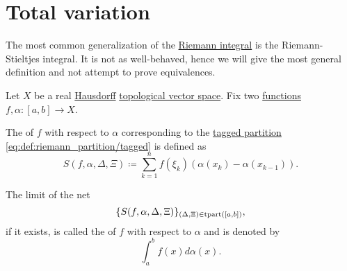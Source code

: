 \section{Total variation}\label{sec:total_variation}

\begin{definition}\label{def:riemann_stieltjes_integral}
  The most common generalization of the \hyperref[def:riemann_integral]{Riemann integral} is the Riemann-Stieltjes integral. It is not as well-behaved, hence we will give the most general definition and not attempt to prove equivalences.

  Let \( X \) be a real \hyperref[def:separation_axioms/T2]{Hausdorff} \hyperref[def:topological_vector_space]{topological vector space}. Fix two \hyperref[def:function]{functions} \( f, \alpha: [a, b] \to X \).

  The  of \( f \) with respect to \( \alpha \) corresponding to the \hyperref[def:riemann_partition/tagged]{tagged partition} \eqref{eq:def:riemann_partition/tagged} is defined as
  \begin{equation*}
    S(f, \alpha, \Delta, \Xi) \coloneqq \sum_{k=1}^n f(\xi_k) (\alpha(x_k) - \alpha(x_{k-1})).
  \end{equation*}

  The limit of the net
  \begin{equation}\label{eq:def:riemann_stieltjes_integral/net}
    \{ S(f, \alpha, \Delta, \Xi) \}_{(\Delta, \Xi) \in \op{tpart}([a, b])},
  \end{equation}
  if it exists, is called the  of \( f \) with respect to \( \alpha \) and is denoted by
  \begin{equation*}
    \int_a^b f(x) d \alpha(x).
  \end{equation*}
\end{definition}
